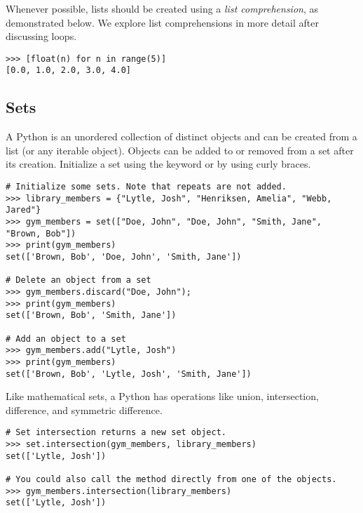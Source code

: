 Whenever possible, lists should be created using a \emph{list comprehension}, as demonstrated below.
We explore list comprehensions in more detail after discussing loops.
\begin{lstlisting}
>>> [float(n) for n in range(5)]
[0.0, 1.0, 2.0, 3.0, 4.0]
\end{lstlisting}



\subsection*{Sets}
A Python  is an unordered collection of distinct objects and can be created from a list (or any iterable object).
Objects can be added to or removed from a set after its creation.
Initialize a set using the keyword  or by using curly braces.
\begin{lstlisting}
# Initialize some sets. Note that repeats are not added.
>>> library_members = {"Lytle, Josh", "Henriksen, Amelia", "Webb, Jared"}
>>> gym_members = set(["Doe, John", "Doe, John", "Smith, Jane", "Brown, Bob"])
>>> print(gym_members)
set(['Brown, Bob', 'Doe, John', 'Smith, Jane'])

# Delete an object from a set
>>> gym_members.discard("Doe, John");
>>> print(gym_members)
set(['Brown, Bob', 'Smith, Jane'])

# Add an object to a set
>>> gym_members.add("Lytle, Josh")
>>> print(gym_members)
set(['Brown, Bob', 'Lytle, Josh', 'Smith, Jane'])
\end{lstlisting}

Like mathematical sets, a Python  has operations like union, intersection, 
difference, and symmetric difference.
\begin{lstlisting}
# Set intersection returns a new set object.
>>> set.intersection(gym_members, library_members)
set(['Lytle, Josh'])

# You could also call the method directly from one of the objects.
>>> gym_members.intersection(library_members)
set(['Lytle, Josh'])
\end{lstlisting}

